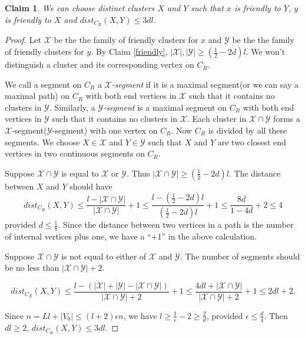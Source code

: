 \documentclass[11pt]{article}
\newtheorem{claim}[lemma]{Claim}
\begin{document}
\begin{claim}\label{close}
We can choose distinct clusters $X$ and $Y$ such that $x$ is friendly to $Y$, $y$ is friendly to $X$ and $dist_{C_R}(X,Y)\leq 3dl$.
\end{claim}

\begin{proof}
Let $\mathcal{X}$ be the the family of friendly clusters for $x$ and $\mathcal{Y}$ be the the family of friendly clusters for $y$. By Claim \ref{friendly}, $|\mathcal{X}|,|\mathcal{Y}|\geq (\frac{1}{2}-2d)l$. We won't distinguish a cluster and its corresponding vertex on $C_R$.

We call a segment on $C_R$ a {\em $\mathcal{X}$-segment} if it is a maximal segment(or we can say a maximal path) on $C_R$ with both end vertices in $\mathcal{X}$ such that it contains no clusters in $\mathcal{Y}$. Similarly, a {\em $\mathcal{Y}$-segment} is a maximal segment on $C_R$ with both end vertices in $\mathcal{Y}$ such that it contains no clusters in $\mathcal{X}$. Each cluster in $\mathcal{X}\cap\mathcal{Y}$ forms a $\mathcal{X}$-segment($\mathcal{Y}$-segment) with one vertex on $C_R$. Now $C_R$ is divided by all these segments. We choose $X\in \mathcal{X}$ and $Y\in \mathcal{Y}$ such that $X$ and $Y$ are two closest end vertices in two continuous segments on $C_R$.

Suppose $\mathcal{X}\cap\mathcal{Y}$ is equal to $\mathcal{X}$ or $\mathcal{Y}$. Thus $|\mathcal{X}\cap\mathcal{Y}|\geq (\frac{1}{2}-2d)l$. The distance between $X$ and $Y$ should have
$$dist_{C_R}(X,Y)\leq \frac{l-|\mathcal{X}\cap\mathcal{Y}|}{|\mathcal{X}\cap\mathcal{Y}|}+1\leq \frac{l-(\frac{1}{2}-2d)l}{(\frac{1}{2}-2d)l}+1\leq \frac{8d}{1-4d}+2\leq 4$$
provided $d\leq \frac{1}{8}$. Since the distance between two vertices in a path is the number of internal vertices plus one, we have a ``+1'' in the above calculation.

Suppose $\mathcal{X}\cap\mathcal{Y}$ is not equal to either of $\mathcal{X}$ and $\mathcal{Y}$. The number of segments should be no less than $|\mathcal{X}\cap\mathcal{Y}|+2$.

$$dist_{C_R}(X,Y)\leq \frac{l-(|\mathcal{X}|+|\mathcal{Y}|-|\mathcal{X}\cap\mathcal{Y}|)}{|\mathcal{X}\cap\mathcal{Y}|+2}+1\leq \frac{4dl+|\mathcal{X}\cap\mathcal{Y}|}{|\mathcal{X}\cap\mathcal{Y}|+2}+1\leq 2dl+2.$$

Since $n=Ll+|V_0|\leq (l+2)\epsilon n$, we have $l\geq \frac{1}{\epsilon }-2\geq \frac{2}{d}$, provided $\epsilon \leq \frac{d}{4}$. Then $dl\geq 2$, $dist_{C_R}(X,Y)\leq 3dl$.
\end{proof}
\end{document}
